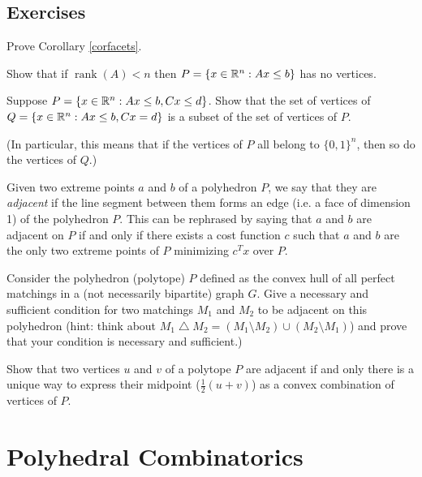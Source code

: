 \documentclass[12pt]{article}
\newcommand{\rank}{\operatorname{rank}}
\begin{document}
\subsection*{Exercises}

\begin{exercises}
\item
Prove Corollary \ref{corfacets}.
\item \label{ex-novertex}
Show that if $\rank(A)<n$ then $P=\{x\in {\mathbb R}^n: Ax \leq b\}$ has no vertices.

\item \label{ex-face}
Suppose $P=\{x\in {\mathbb R}^n: Ax\leq b, Cx\leq d\}$. Show that the
set of  vertices of $Q=\{x\in {\mathbb R}^n: Ax \leq b, Cx = d\}$ is a subset
of the set of vertices of $P$.

(In particular, this means that if the vertices of $P$ all belong to
$\{0,1\}^n$, then so do the vertices of $Q$.)

\item
Given two extreme points $a$ and $b$ of a polyhedron $P$, we say that they are
{\it adjacent} if the line segment between them forms an edge (i.e. a face
of dimension 1) of the polyhedron $P$. This can be rephrased by saying
that $a$ and $b$ are adjacent on $P$ if and only if there exists a
cost function $c$ such that $a$ and $b$ are the only two extreme
points of $P$ minimizing $c^Tx$ over $P$.

Consider the polyhedron (polytope) $P$ defined as the convex hull of
all perfect matchings in a (not necessarily bipartite) graph $G$. Give
a necessary and sufficient condition for two matchings $M_1$ and $M_2$
to be adjacent on this polyhedron (hint: think about $M_1
\bigtriangleup M_2=(M_1\setminus M_2) \cup (M_2\setminus M_1)$) and
prove that your condition is necessary and sufficient.)

\item Show that two vertices $u$ and $v$ of a polytope $P$ are
  adjacent if and only there is a unique way to express their midpoint
  ($\frac{1}{2}(u+v)$) as a convex combination of vertices of $P$.

\end{exercises}

\section{Polyhedral Combinatorics}
\end{document}
